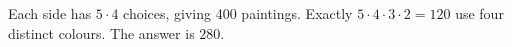 Each side has $ 5\cdot4 $ choices, giving 400 paintings. Exactly $ 5\cdot4\cdot3\cdot2=120 $ use four distinct colours. The answer is $\boxed{280}$.
